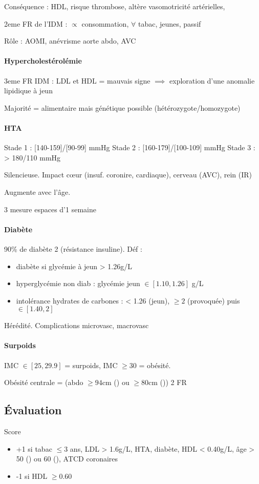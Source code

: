Conséquence : \dec HDL, \inc risque thrombose, altère vasomotricité artérielles,
\inc [CO]

2eme FR de l'IDM : $\propto$ consommation, $\forall$ tabac, jeunes, passif

Rôle : AOMI, anévrisme aorte abdo, AVC

\paragraph{Hypercholestérolémie}
3eme FR IDM : \inc LDL et \dec HDL = mauvais signe $\implies$ exploration d'une
anomalie lipidique à jeun

Majorité = alimentaire mais génétique possible (hétérozygote/homozygote)

\paragraph{HTA}
Stade 1 : [140-159]/[90-99] mmHg
Stade 2 : [160-179]/[100-109] mmHg
Stade 3 : > 180/110 mmHg

Silencieuse. Impact c\oe{}ur (insuf. coronire, cardiaque), cerveau (AVC), rein (IR)

Augmente avec l'âge.

3 mesure espaces d'1 semaine

\paragraph{Diabète}
90\% de diabète 2 (résistance insuline). Déf :
\begin{itemize}
  \item diabète si glycémie à jeun > 1.26g/L
  \item hyperglycémie non diab : glycémie jeun $\in [1.10, 1.26]$ g/L
  \item intolérance hydrates de carbones : < 1.26 (jeun), $\ge 2$ (provoquée)
    puis $\in [1.40, 2]$
\end{itemize}
Hérédité. Complications microvasc, macrovasc

\paragraph{Surpoids}
IMC $\in [25, 29.9]$ = surpoids, IMC $\ge 30$ = obésité. 

Obésité centrale = (\diameter abdo $\ge 94 $cm (\male) ou $\ge 80$cm (\female))
\land{} 2 FR


\subsection{Évaluation}
\label{subsec:fr}
Score
\begin{itemize}
  \item +1 si {tabac $\le 3$ ans, LDL > 1.6g/L, HTA, diabète, HDL < 0.40g/L, âge > 50
(\male) ou 60 (\female), ATCD coronaires}
  \item  -1 si HDL $\ge 0.60$
\end{itemize}

